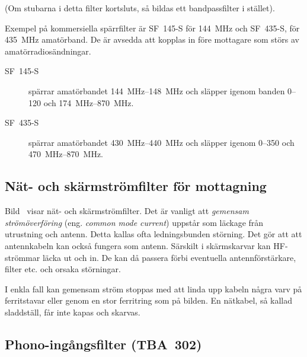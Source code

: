(Om stubarna i detta filter kortsluts, så bildas ett bandpassfilter i stället).

Exempel på kommersiella spärrfilter är SF~145-S för \qty{144}{\mega\hertz} och
SF~435-S, för \qty{435}{\mega\hertz} amatörband.
De är avsedda att kopplas in före mottagare som störs av amatörradiosändningar.

\begin{description}
\item[SF~145-S] spärrar amatörbandet \SIrange{144}{148}{\mega\hertz} och släpper
igenom banden 0--120 och \SIrange{174}{870}{\mega\hertz}.

\item[SF~435-S] spärrar amatörbandet \SIrange{430}{440}{\mega\hertz} och släpper
igenom 0--350 och \SIrange{470}{870}{\mega\hertz}.
\end{description}

\subsection{Nät- och skärmströmfilter för mottagning}


Bild~ visar nät- och skärmströmfilter.
Det är vanligt att \emph{gemensam strömöverföring} (eng.
\emph{common mode current}) uppstår som läckage från utrustning och antenn.
Detta kallas ofta ledningsbunden störning.
Det gör att att antennkabeln kan också fungera som antenn.
Särskilt i skärmskarvar kan HF-strömmar läcka ut och in.
De kan då passera förbi eventuella antennförstärkare, filter etc. och orsaka
störningar.

I enkla fall kan gemensam ström stoppas med att linda upp kabeln några varv på
ferritstavar eller genom en stor ferritring som på bilden.
En nätkabel, så kallad sladdställ, får inte kapas och skarvas.

\newpage
\subsection{Phono-ingångsfilter (TBA~302)}



